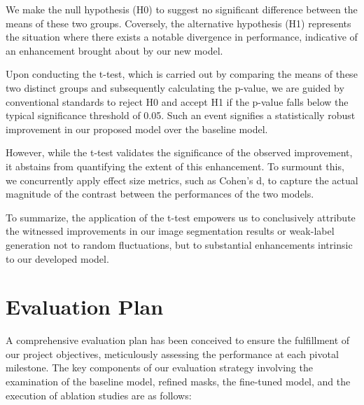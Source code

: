 We make the null hypothesis (H0) to suggest no significant difference between the means of these two groups. Coversely, the alternative hypothesis (H1) represents the situation where there exists a notable divergence in performance, indicative of an enhancement brought about by our new model.

Upon conducting the t-test, which is carried out by comparing the means of these two distinct groups and subsequently calculating the p-value, we are guided by conventional standards to reject H0 and accept H1 if the p-value falls below the typical significance threshold of 0.05. Such an event signifies a statistically robust improvement in our proposed model over the baseline model.

However, while the t-test validates the significance of the observed improvement, it abstains from quantifying the extent of this enhancement. To surmount this, we concurrently apply effect size metrics, such as Cohen's d, to capture the actual magnitude of the contrast between the performances of the two models.

To summarize, the application of the t-test empowers us to conclusively attribute the witnessed improvements in our image segmentation results or weak-label generation not to random fluctuations, but to substantial enhancements intrinsic to our developed model.



\section{Evaluation Plan}
A comprehensive evaluation plan has been conceived to ensure the fulfillment of our project objectives, meticulously assessing the performance at each pivotal milestone. The key components of our evaluation strategy involving the examination of the baseline model, refined masks, the fine-tuned model, and the execution of ablation studies are as follows:


